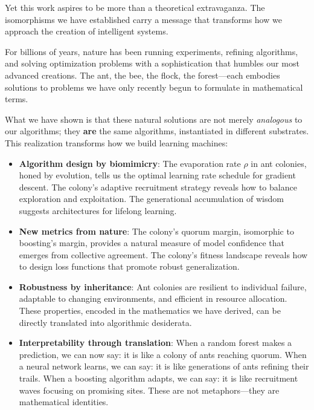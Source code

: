 \documentclass[12pt,letterpaper]{article}
\begin{document}
Yet this work aspires to be more than a theoretical extravaganza. The isomorphisms we have established carry a message that transforms how we approach the creation of intelligent systems.

For billions of years, nature has been running experiments, refining algorithms, and solving optimization problems with a sophistication that humbles our most advanced creations. The ant, the bee, the flock, the forest—each embodies solutions to problems we have only recently begun to formulate in mathematical terms.

What we have shown is that these natural solutions are not merely \emph{analogous} to our algorithms; they \textbf{are} the same algorithms, instantiated in different substrates. This realization transforms how we build learning machines:

\begin{itemize}
    \item \textbf{Algorithm design by biomimicry}: The evaporation rate $\rho$ in ant colonies, honed by evolution, tells us the optimal learning rate schedule for gradient descent. The colony's adaptive recruitment strategy reveals how to balance exploration and exploitation. The generational accumulation of wisdom suggests architectures for lifelong learning.
    
    \item \textbf{New metrics from nature}: The colony's quorum margin, isomorphic to boosting's margin, provides a natural measure of model confidence that emerges from collective agreement. The colony's fitness landscape reveals how to design loss functions that promote robust generalization.
    
    \item \textbf{Robustness by inheritance}: Ant colonies are resilient to individual failure, adaptable to changing environments, and efficient in resource allocation. These properties, encoded in the mathematics we have derived, can be directly translated into algorithmic desiderata.
    
    \item \textbf{Interpretability through translation}: When a random forest makes a prediction, we can now say: it is like a colony of ants reaching quorum. When a neural network learns, we can say: it is like generations of ants refining their trails. When a boosting algorithm adapts, we can say: it is like recruitment waves focusing on promising sites. These are not metaphors—they are mathematical identities.
\end{itemize}
\end{document}
